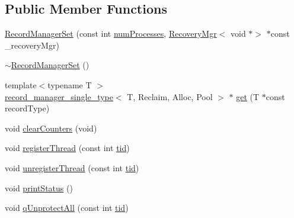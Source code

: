 \subsection*{Public Member Functions}
\begin{DoxyCompactItemize}
\item 
\hyperlink{classRecordManagerSet_3_01Reclaim_00_01Alloc_00_01Pool_00_01First_00_01Rest_8_8_8_01_4_acf1d83aa2ab7d1691e99b7aabcdff426}{Record\+Manager\+Set} (const int \hyperlink{testing_8cpp_aa085812188e21ede75351d88b9b2c30d}{num\+Processes}, \hyperlink{classRecoveryMgr}{Recovery\+Mgr}$<$ void $\ast$$>$ $\ast$const \+\_\+recovery\+Mgr)
\item 
\hyperlink{classRecordManagerSet_3_01Reclaim_00_01Alloc_00_01Pool_00_01First_00_01Rest_8_8_8_01_4_a9209878081140bd31a47b96b410ec22a}{$\sim$\+Record\+Manager\+Set} ()
\item 
{\footnotesize template$<$typename T $>$ }\\\hyperlink{classrecord__manager__single__type}{record\+\_\+manager\+\_\+single\+\_\+type}$<$ T, Reclaim, Alloc, Pool $>$ $\ast$ \hyperlink{classRecordManagerSet_3_01Reclaim_00_01Alloc_00_01Pool_00_01First_00_01Rest_8_8_8_01_4_ad755746ae5e804082f4373331dc9f516}{get} (T $\ast$const record\+Type)
\item 
void \hyperlink{classRecordManagerSet_3_01Reclaim_00_01Alloc_00_01Pool_00_01First_00_01Rest_8_8_8_01_4_a1c3bc38c1d9ed9fae1506f1fe6bba602}{clear\+Counters} (void)
\item 
void \hyperlink{classRecordManagerSet_3_01Reclaim_00_01Alloc_00_01Pool_00_01First_00_01Rest_8_8_8_01_4_a30ad594b51539497d6e54363899205ae}{register\+Thread} (const int \hyperlink{microbench_2main_8cpp_a9ca9869868fe7e7a38a921cc7de4103f}{tid})
\item 
void \hyperlink{classRecordManagerSet_3_01Reclaim_00_01Alloc_00_01Pool_00_01First_00_01Rest_8_8_8_01_4_ace148ff49e1acd8ffe3fde0642ab2c9a}{unregister\+Thread} (const int \hyperlink{microbench_2main_8cpp_a9ca9869868fe7e7a38a921cc7de4103f}{tid})
\item 
void \hyperlink{classRecordManagerSet_3_01Reclaim_00_01Alloc_00_01Pool_00_01First_00_01Rest_8_8_8_01_4_a4275f4dca389386d12dc1d5e256eccf8}{print\+Status} ()
\item 
void \hyperlink{classRecordManagerSet_3_01Reclaim_00_01Alloc_00_01Pool_00_01First_00_01Rest_8_8_8_01_4_a4e25436580102b283a893175f2f52eca}{q\+Unprotect\+All} (const int \hyperlink{microbench_2main_8cpp_a9ca9869868fe7e7a38a921cc7de4103f}{tid})
\item 
$$
\end{DoxyCompactItemize}
